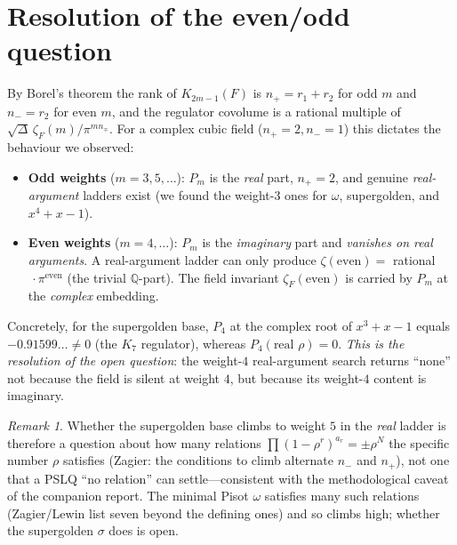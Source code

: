 \documentclass[11pt]{article}
\theoremstyle{plain}\newtheorem{theorem}{Theorem}\newtheorem{proposition}[theorem]{Proposition}
\theoremstyle{remark}\newtheorem{remark}[theorem]{Remark}
\begin{document}
\section{Resolution of the even/odd question}
By Borel's theorem the rank of $K_{2m-1}(F)$ is $n_+=r_1+r_2$ for odd $m$ and $n_-=r_2$ for even $m$, and the
regulator covolume is a rational multiple of $\sqrt{\Delta}\,\zeta_F(m)/\pi^{m n_\mp}$. For a complex cubic field
($n_+=2,n_-=1$) this dictates the behaviour we observed:
\begin{itemize}
\item \textbf{Odd weights} ($m=3,5,\dots$): $P_m$ is the \emph{real} part, $n_+=2$, and genuine \emph{real-argument}
ladders exist (we found the weight-$3$ ones for $\omega$, supergolden, and $x^4+x-1$).
\item \textbf{Even weights} ($m=4,\dots$): $P_m$ is the \emph{imaginary} part and \emph{vanishes on real arguments}.
A real-argument ladder can only produce $\zeta(\text{even})=$ rational$\,\cdot\pi^{\text{even}}$ (the trivial
$\mathbb Q$-part). The field invariant $\zeta_F(\text{even})$ is carried by $P_m$ at the \emph{complex} embedding.
\end{itemize}
Concretely, for the supergolden base, $P_4$ at the complex root of $x^3+x-1$ equals $-0.91599\ldots\neq0$ (the
$K_7$ regulator), whereas $P_4(\text{real }\rho)=0$. \emph{This is the resolution of the open question}: the
weight-$4$ real-argument search returns ``none'' not because the field is silent at weight $4$, but because its
weight-$4$ content is imaginary.
\begin{remark}
Whether the supergolden base climbs to weight $5$ in the \emph{real} ladder is therefore a question about how many
relations $\prod(1-\rho^r)^{a_r}=\pm\rho^N$ the specific number $\rho$ satisfies (Zagier: the conditions to climb
alternate $n_-$ and $n_+$), not one that a PSLQ ``no relation'' can settle---consistent with the methodological
caveat of the companion report. The minimal Pisot $\omega$ satisfies many such relations (Zagier/Lewin list seven
beyond the defining ones) and so climbs high; whether the supergolden $\sigma$ does is open.
\end{remark}
\end{document}
